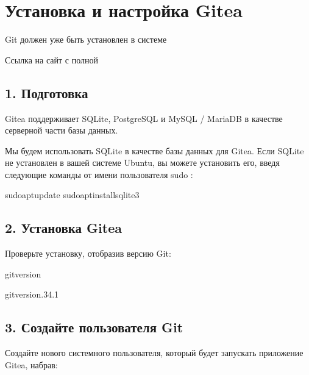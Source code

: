 \documentclass[letterpaper,10pt,russian]{sphinxmanual}
\begin{document}
\sphinxstepscope


\chapter{Установка и настройка Gitea}
\label{\detokenize{git:gitea}}\label{\detokenize{git::doc}}
\sphinxAtStartPar
Git должен уже быть установлен в системе \sphinxhyphen{}  

\sphinxAtStartPar
Ссылка на сайт с полной 


\section{1. Подготовка}
\label{\detokenize{git:id2}}
\sphinxAtStartPar
Gitea поддерживает SQLite, PostgreSQL и MySQL / MariaDB в качестве серверной части базы данных.

\sphinxAtStartPar
Мы будем использовать SQLite в качестве базы данных для Gitea. Если SQLite не установлен в вашей
системе Ubuntu, вы можете установить его, введя следующие команды от имени пользователя sudo :

\begin{sphinxVerbatim}[commandchars=\\\{\}]
\PYGZdl{}sudoaptupdate
\PYGZdl{}sudoaptinstallsqlite3
\end{sphinxVerbatim}


\section{2. Установка Gitea}
\label{\detokenize{git:id3}}
\sphinxAtStartPar
Проверьте установку, отобразив версию Git:

\begin{sphinxVerbatim}[commandchars=\\\{\}]
\PYGZdl{}git\PYGZhy{}\PYGZhy{}version
\end{sphinxVerbatim}

\begin{sphinxVerbatim}[commandchars=\\\{\}]
\PYGZdl{}gitversion.34.1
\end{sphinxVerbatim}


\section{3. Создайте пользователя Git}
\label{\detokenize{git:git}}
\sphinxAtStartPar
Создайте нового системного пользователя, который будет запускать приложение Gitea, набрав:
\end{document}
